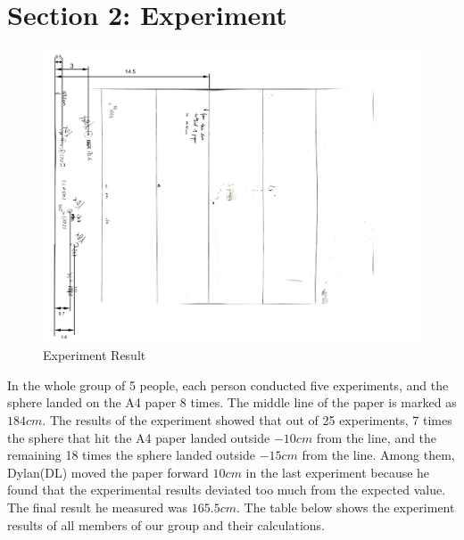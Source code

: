 \documentclass{article}
\begin{document}
\section{Section 2: Experiment}
    \begin{figure}[H]
        \centering
        \includegraphics[width=1\linewidth]{experiment result.png}
        \caption{Experiment Result}
        \label{fig:result}
    \end{figure}
    In the whole group of 5 people, each person conducted five experiments, and the sphere landed on the A4 paper 8 times. The middle line of the paper is marked as $184cm$. The results of the experiment showed that out of 25 experiments, 7 times the sphere that hit the A4 paper landed outside $-10cm$ from the line, and the remaining 18 times the sphere landed outside $-15cm$ from the line. Among them, Dylan(DL) moved the paper forward $10cm$ in the last experiment because he found that the experimental results deviated too much from the expected value. The final result he measured was $165.5cm$.
    The table below shows the experiment results of all members of our group and their calculations. 
\end{document}
